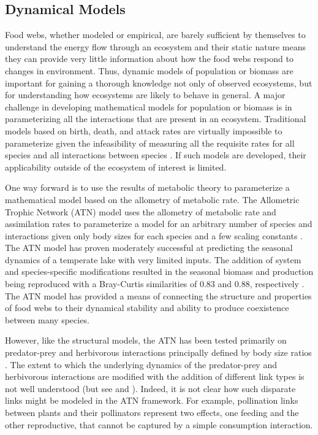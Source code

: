 \documentclass[../dissertation.tex]{subfiles}
\begin{document}
\begin{bibunit}
\section{Dynamical Models}

Food webs, whether modeled or empirical, are barely sufficient by themselves to
understand the energy flow through an ecosystem and their static nature means
they can provide very little information about how the food webs respond to
changes in environment. Thus, dynamic models of population or biomass are
important for gaining a thorough knowledge not only of observed ecosystems, but
for understanding how ecosystems are likely to behave in general. A major
challenge in developing mathematical models for population or biomass is in
parameterizing all the interactions that are present in an ecosystem.
Traditional models based on birth, death, and attack rates are virtually
impossible to parameterize given the infeasibility of measuring all the
requisite rates for all species and all interactions between species
\cite*{Yodzis1992}. If such models are developed, their applicability outside of
the ecosystem of interest is limited.

One way forward is to use the results of metabolic theory to parameterize a
mathematical model based on the allometry of metabolic rate. The Allometric
Trophic Network (ATN) model uses the allometry of metabolic rate and
assimilation rates to parameterize a model for an arbitrary number of species
and interactions given only body sizes for each species and a few scaling
constants \cite*{Williams2007, Yodzis1992}. The ATN model has proven moderately
successful at predicting the seasonal dynamics of a temperate lake with very
limited inputs. The addition of system and species-specific modifications
resulted in the seasonal biomass and production being reproduced with a
Bray-Curtis similarities of 0.83 and 0.88, respectively \cite*{Boit2012}.
The ATN model has provided a means of connecting the structure and properties
of food webs to their dynamical stability and ability to produce coexistence
between many species.

However, like the structural models, the ATN has been tested primarily on
predator-prey and herbivorous interactions principally defined by body size
ratios \cite*{Brose2006b, Otto2007, Jonsson2018}. The extent to which the
underlying dynamics of the predator-prey and herbivorous interactions are
modified with the addition of different link types is not well understood (but
see \cite*{Mougi2012} and \cite*{Kefi2016}). Indeed, it is not clear how such
disparate links might be modeled in the ATN framework. For example, pollination
links between plants and their pollinators represent two effects, one feeding
and the other reproductive, that cannot be captured by a simple consumption
interaction.


\end{bibunit}
\end{document}
